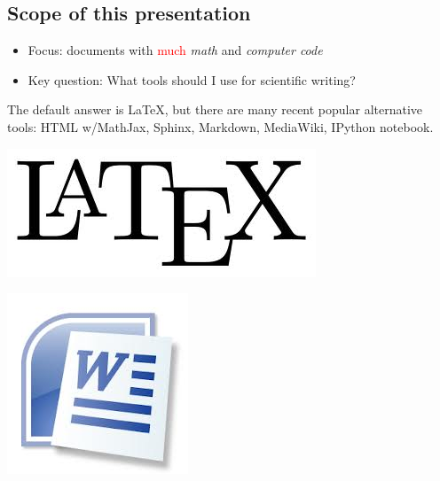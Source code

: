 \documentclass[%
twoside,                 %
draft,                   %
final,                   %
chapterprefix=true,      %
open=right               %
10pt]{book}
\newenvironment{graybox1admon}[1][]{
\begin{graybox1mdframed}[frametitle=#1]
}
{
\end{graybox1mdframed}
}
\begin{document}
\begin{shadedquoteBlue}


\section*{Scope of this presentation}

\begin{itemize}
  \item Focus: documents with \textcolor{red}{much} \emph{math} and \emph{computer code}

  \item Key question: What tools should I use for scientific writing?
\end{itemize}

\noindent

\begin{graybox1admon}[]
The default answer is {\LaTeX}, but there are many
recent popular alternative tools: HTML w/MathJax,
Sphinx, Markdown, MediaWiki, IPython notebook.
\end{graybox1admon}





\begin{center}  %
  \centerline{\includegraphics[width=0.3\linewidth]{fig/LaTeX_logo.jpg}}
\end{center}



\begin{center}  %
  \centerline{\includegraphics[width=0.2\linewidth]{fig/MS_Word_logo.jpg}}
\end{center}




\end{shadedquoteBlue}
\end{document}
